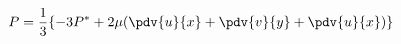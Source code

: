 \begin{equation}
  P = \frac{1}{3} \{ -3P^* + 2\mu(\pdv{u}{x} + \pdv{v}{y} + \pdv{u}{x} ) \}
\end{equation}

